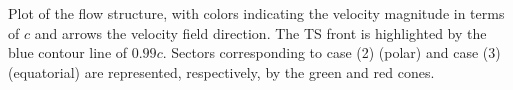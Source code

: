 Plot of the flow structure, with colors indicating the velocity magnitude in terms of $c$ and arrows the velocity field direction. The TS front is highlighted by the blue contour line of $0.99c$. Sectors corresponding to case (2) (polar) and case (3) (equatorial) are represented, respectively, by the green and red cones.\label{ts}